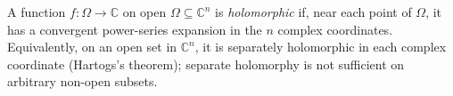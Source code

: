 
A function $f:\Omega\to\mathbb C$ on open $\Omega\subseteq\mathbb C^n$ is \emph{holomorphic} if, near each point of $\Omega$, it has a convergent power-series expansion in the $n$ complex coordinates. Equivalently, on an open set in $\mathbb C^n$, it is separately holomorphic in each complex coordinate (Hartogs's theorem); separate holomorphy is not sufficient on arbitrary non-open subsets.
